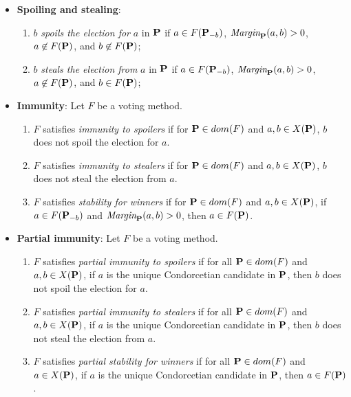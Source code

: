 \begin{definition}
    \begin{itemize}
        \item \textbf{Spoiling and stealing}:
        \begin{enumerate}
            \item $b$ \emph{spoils the election for} $a$ in $\mathbf{P}$ if $a \in F (\mathbf{P}_{-b})$, $\textit{Margin}_{\mathbf{P}}(a, b) > 0$, $a \not \in  F (\mathbf{P})$, and $b \not \in F(\mathbf{P})$;
            \item $b$ \emph{steals the election from} $a$ in $\mathbf{P}$ if $a \in F (\mathbf{P}_{-b})$, $\textit{Margin}_{\mathbf{P}}(a, b) > 0$, $a \not \in  F (\mathbf{P})$, and $b \in F(\mathbf{P})$;
        \end{enumerate}
        \item \textbf{Immunity}: Let $F$ be a voting method.
        \begin{enumerate}
            \item $F$ satisfies \emph{immunity to spoilers} if for $\mathbf{P} \in dom(F)$ and $a, b \in X(\mathbf{P})$, $b$ does not spoil the election for $a$.
            \item $F$ satisfies \emph{immunity to stealers} if for $\mathbf{P} \in dom(F)$ and $a, b \in X(\mathbf{P})$, $b$ does not steal the election from $a$.
            \item $F$ satisfies \emph{stability for winners} if for $\mathbf{P} \in dom(F)$ and $a, b \in X(\mathbf{P})$, if $a \in F (\mathbf{P}_{-b})$ and $\textit{Margin}_{\mathbf{P}}(a, b) > 0$, then $a \in F(\mathbf{P})$.
        \end{enumerate}
        \item \textbf{Partial immunity}: Let $F$ be a voting method. 
        \begin{enumerate}
            \item $F$ satisfies \emph{partial immunity to spoilers} if for all $\mathbf{P} \in dom(F)$ and $a, b \in X(\mathbf{P})$, if $a$ is the unique Condorcetian candidate in $\mathbf{P}$, then $b$ does not spoil the election for $a$.
            \item $F$ satisfies \emph{partial immunity to stealers} if for all $\mathbf{P} \in dom(F)$ and $a, b \in X(\mathbf{P})$, if $a$ is the unique Condorcetian candidate in $\mathbf{P}$, then $b$ does not steal the election from $a$.
            \item $F$ satisfies \emph{partial stability for winners} if for all $\mathbf{P} \in dom(F)$ and $a \in X(\mathbf{P})$, if $a$ is the unique Condorcetian candidate in $\mathbf{P}$, then $a \in F(\mathbf{P})$.

\end{enumerate}
\end{itemize}
\end{definition}
